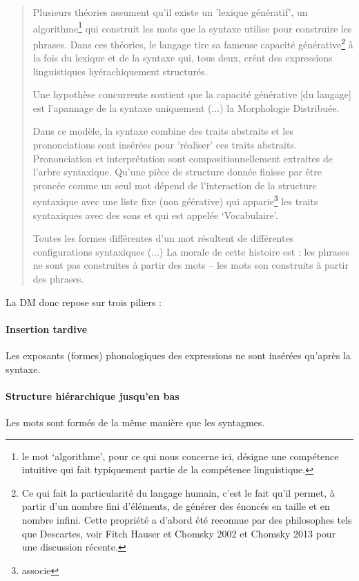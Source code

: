       \begin{quote}
    	Plusieurs th\'eories assument qu'il existe un 'lexique g\'en\'eratif', un algorithme\footnote{le mot `algorithme', pour ce qui nous concerne ici, d\'esigne une compétence intuitive qui fait typiquement partie de la comp\'etence linguistique.} qui construit les mots que la syntaxe utilise pour construire les phrases. Dans ces th\'eories, le langage tire sa fameuse capacit\'e g\'en\'erative\footnote{Ce qui fait la particularit\'e du langage humain, c'est le fait qu'il permet, \`a partir d'un nombre fini d'\'el\'ements, de g\'en\'erer des \'enonc\'es en taille et en nombre infini. Cette propri\'et\'e a d'abord \'et\'e reconnue par des philosophes tels que Descartes, voir Fitch Hauser et Chomsky 2002 et Chomsky 2013 pour une discussion récente.} \`a la fois du lexique et de la syntaxe qui, tous deux, cr\'ent des expressions linguistiques hy\'erachiquement structur\'es. 
    	
    	\noindent Une hypoth\`ese concurrente soutient que la capacit\'e g\'en\'erative [du langage] est l'apannage de la syntaxe uniquement (...) la Morphologie Distribu\'ee.
    	
    	\noindent Dans ce mod\`ele, la syntaxe combine des traits abstraits et les prononciations sont ins\'er\'ees pour 'r\'ealiser' ces traits abstraits. Prononciation et interpr\'etation sont compositionnellement extraites de l'arbre syntaxique. Qu'une pi\`ece de structure donn\'ee finisse par \^etre pronc\'ee comme un seul mot d\'epend de l'interaction de la structure syntaxique avec une liste fixe (non g\'e\'erative) qui apparie\footnote{associe} les traits syntaxiques avec des sons et qui est appel\'ee `Vocabulaire'.
    	
    	Toutes les formes diff\'erentes d'un mot r\'esultent de diff\'erentes configurations syntaxiques (...) La morale de cette histoire est : les phrases ne sont pas construites \`a partir des mots -- les mots son construits \`a partir des phrases.
      \end{quote}
      La DM donc repose sur trois piliers :
      \paragraph{Insertion tardive}
        Les exposants (formes) phonologiques des expressions ne sont ins\'er\'ees qu'apr\`es la syntaxe.
      \paragraph{Structure hi\'erarchique jusqu'en bas}
        Les mots sont form\'es de la m\^eme mani\`ere que les syntagmes.
